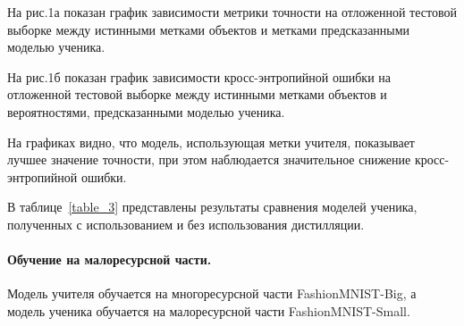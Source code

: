 На рис.1а показан график зависимости метрики точности на отложенной тестовой выборке между истинными метками объектов и метками предсказанными моделью ученика.

На рис.1б показан график зависимости кросс-энтропийной ошибки на отложенной тестовой выборке между истинными метками объектов и вероятностями, предсказанными моделью ученика.

На графиках видно, что модель, использующая метки учителя, показывает лучшее значение точности, при этом наблюдается значительное снижение кросс-энтропийной ошибки.


\begin{table}[h!t]
\begin{center}
\caption{Качество моделей}
\label{table_3}
\end{center}
\end{table}

В таблице~\ref{table_3} представлены результаты сравнения моделей ученика, полученных с использованием и без использования дистилляции.

\newpage
\paragraph{Обучение на малоресурсной части.}
Модель учителя обучается на многоресурсной части FashionMNIST-Big, а модель ученика обучается на малоресурсной части FashionMNIST-Small.

